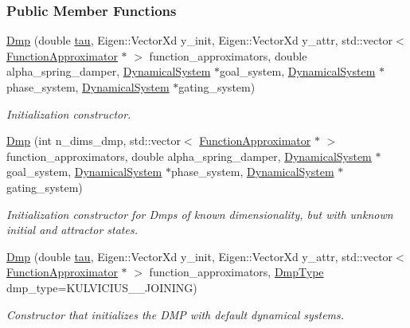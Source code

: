 \subsubsection*{Public Member Functions}
\begin{DoxyCompactItemize}
\item 
\hyperlink{classDmpBbo_1_1Dmp_a4d4f5e7b4c2d8085355c228e2f8a9763}{Dmp} (double \hyperlink{group__DynamicalSystems_ga50eec7ad4c9664b5809ace45b22200d5}{tau}, Eigen\+::\+Vector\+Xd y\+\_\+init, Eigen\+::\+Vector\+Xd y\+\_\+attr, std\+::vector$<$ \hyperlink{classDmpBbo_1_1FunctionApproximator}{Function\+Approximator} $\ast$ $>$ function\+\_\+approximators, double alpha\+\_\+spring\+\_\+damper, \hyperlink{classDmpBbo_1_1DynamicalSystem}{Dynamical\+System} $\ast$goal\+\_\+system, \hyperlink{classDmpBbo_1_1DynamicalSystem}{Dynamical\+System} $\ast$phase\+\_\+system, \hyperlink{classDmpBbo_1_1DynamicalSystem}{Dynamical\+System} $\ast$gating\+\_\+system)
\begin{DoxyCompactList}\small\item\em Initialization constructor. \end{DoxyCompactList}\item 
\hyperlink{classDmpBbo_1_1Dmp_a5861ed5fdc3e3472944c592414b4e8cb}{Dmp} (int n\+\_\+dims\+\_\+dmp, std\+::vector$<$ \hyperlink{classDmpBbo_1_1FunctionApproximator}{Function\+Approximator} $\ast$ $>$ function\+\_\+approximators, double alpha\+\_\+spring\+\_\+damper, \hyperlink{classDmpBbo_1_1DynamicalSystem}{Dynamical\+System} $\ast$goal\+\_\+system, \hyperlink{classDmpBbo_1_1DynamicalSystem}{Dynamical\+System} $\ast$phase\+\_\+system, \hyperlink{classDmpBbo_1_1DynamicalSystem}{Dynamical\+System} $\ast$gating\+\_\+system)
\begin{DoxyCompactList}\small\item\em Initialization constructor for Dmps of known dimensionality, but with unknown initial and attractor states. \end{DoxyCompactList}\item 
\hyperlink{classDmpBbo_1_1Dmp_a0a26f231a585e9f7f7f2d2dd571515b7}{Dmp} (double \hyperlink{group__DynamicalSystems_ga50eec7ad4c9664b5809ace45b22200d5}{tau}, Eigen\+::\+Vector\+Xd y\+\_\+init, Eigen\+::\+Vector\+Xd y\+\_\+attr, std\+::vector$<$ \hyperlink{classDmpBbo_1_1FunctionApproximator}{Function\+Approximator} $\ast$ $>$ function\+\_\+approximators, \hyperlink{group__Dmps_gaccba8d09ec99ae66e469b3511bb232a4}{Dmp\+Type} dmp\+\_\+type=K\+U\+L\+V\+I\+C\+I\+U\+S\+\_\+\_\+\+J\+O\+I\+N\+I\+N\+G)
\begin{DoxyCompactList}\small\item\em Constructor that initializes the D\+M\+P with default dynamical systems. \end{DoxyCompactList}\item 

\end{DoxyCompactItemize}
